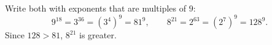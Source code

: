 Write both with exponents that are multiples of $9$:
\[
9^{18}=3^{36}=\left(3^4\right)^9=81^9,\qquad8^{21}=2^{63}=\left(2^7\right)^9=128^9 .
\]
Since $128>81$, $\boxed{8^{21}}$ is greater.
